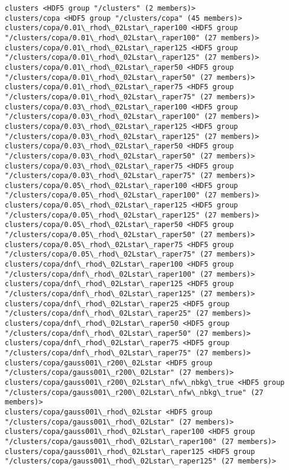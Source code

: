 \documentclass[11pt]{article}
\begin{document}
\begin{Verbatim}[commandchars=\\\{\}]
clusters <HDF5 group "/clusters" (2 members)>
clusters/copa <HDF5 group "/clusters/copa" (45 members)>
clusters/copa/0.01\_rhod\_02Lstar\_raper100 <HDF5 group "/clusters/copa/0.01\_rhod\_02Lstar\_raper100" (27 members)>
clusters/copa/0.01\_rhod\_02Lstar\_raper125 <HDF5 group "/clusters/copa/0.01\_rhod\_02Lstar\_raper125" (27 members)>
clusters/copa/0.01\_rhod\_02Lstar\_raper50 <HDF5 group "/clusters/copa/0.01\_rhod\_02Lstar\_raper50" (27 members)>
clusters/copa/0.01\_rhod\_02Lstar\_raper75 <HDF5 group "/clusters/copa/0.01\_rhod\_02Lstar\_raper75" (27 members)>
clusters/copa/0.03\_rhod\_02Lstar\_raper100 <HDF5 group "/clusters/copa/0.03\_rhod\_02Lstar\_raper100" (27 members)>
clusters/copa/0.03\_rhod\_02Lstar\_raper125 <HDF5 group "/clusters/copa/0.03\_rhod\_02Lstar\_raper125" (27 members)>
clusters/copa/0.03\_rhod\_02Lstar\_raper50 <HDF5 group "/clusters/copa/0.03\_rhod\_02Lstar\_raper50" (27 members)>
clusters/copa/0.03\_rhod\_02Lstar\_raper75 <HDF5 group "/clusters/copa/0.03\_rhod\_02Lstar\_raper75" (27 members)>
clusters/copa/0.05\_rhod\_02Lstar\_raper100 <HDF5 group "/clusters/copa/0.05\_rhod\_02Lstar\_raper100" (27 members)>
clusters/copa/0.05\_rhod\_02Lstar\_raper125 <HDF5 group "/clusters/copa/0.05\_rhod\_02Lstar\_raper125" (27 members)>
clusters/copa/0.05\_rhod\_02Lstar\_raper50 <HDF5 group "/clusters/copa/0.05\_rhod\_02Lstar\_raper50" (27 members)>
clusters/copa/0.05\_rhod\_02Lstar\_raper75 <HDF5 group "/clusters/copa/0.05\_rhod\_02Lstar\_raper75" (27 members)>
clusters/copa/dnf\_rhod\_02Lstar\_raper100 <HDF5 group "/clusters/copa/dnf\_rhod\_02Lstar\_raper100" (27 members)>
clusters/copa/dnf\_rhod\_02Lstar\_raper125 <HDF5 group "/clusters/copa/dnf\_rhod\_02Lstar\_raper125" (27 members)>
clusters/copa/dnf\_rhod\_02Lstar\_raper25 <HDF5 group "/clusters/copa/dnf\_rhod\_02Lstar\_raper25" (27 members)>
clusters/copa/dnf\_rhod\_02Lstar\_raper50 <HDF5 group "/clusters/copa/dnf\_rhod\_02Lstar\_raper50" (27 members)>
clusters/copa/dnf\_rhod\_02Lstar\_raper75 <HDF5 group "/clusters/copa/dnf\_rhod\_02Lstar\_raper75" (27 members)>
clusters/copa/gauss001\_r200\_02Lstar <HDF5 group "/clusters/copa/gauss001\_r200\_02Lstar" (27 members)>
clusters/copa/gauss001\_r200\_02Lstar\_nfw\_nbkg\_true <HDF5 group "/clusters/copa/gauss001\_r200\_02Lstar\_nfw\_nbkg\_true" (27 members)>
clusters/copa/gauss001\_rhod\_02Lstar <HDF5 group "/clusters/copa/gauss001\_rhod\_02Lstar" (27 members)>
clusters/copa/gauss001\_rhod\_02Lstar\_raper100 <HDF5 group "/clusters/copa/gauss001\_rhod\_02Lstar\_raper100" (27 members)>
clusters/copa/gauss001\_rhod\_02Lstar\_raper125 <HDF5 group "/clusters/copa/gauss001\_rhod\_02Lstar\_raper125" (27 members)>

\end{Verbatim}
\end{document}
